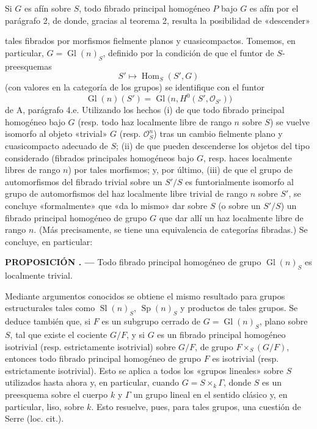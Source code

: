 \documentclass[11pt,twoside,openany]{book}
\numberwithin{equation}{section}
\newcommand{\src}[1]{%
  \phantomsection\hypertarget{src:#1}{}%
  \marginpar{\raggedleft\footnotesize\sffamily #1}%
}
\theoremstyle{plain}
\theoremstyle{definition}
\theoremstyle{remark}
\newcommand{\result}[2]{%
  \par\medskip\noindent\textbf{#1%
  \if\relax\detokenize{#2}\relax\else\space#2\fi. ---}\enspace
}
\newcommand{\FgaUnitKey}{frontmatter}
\renewcommand{\src}[1]{%
  \phantomsection\hypertarget{src:\FgaUnitKey:#1}{}%
  \marginpar{\raggedleft\footnotesize\sffamily #1}%
}
\theoremstyle{plain}
\theoremstyle{definition}
\theoremstyle{remark}
\begin{document}
Si $G$ es afín sobre $S$, todo fibrado principal homogéneo $P$ bajo $G$ es afín
por el parágrafo 2, de donde, gracias al teorema 2, resulta la posibilidad de
«descender»

\src{326}
tales fibrados por morfismos fielmente planos y cuasicompactos. Tomemos, en
particular, $G=\operatorname{Gl}(n)_S$, definido por la condición de que el
funtor de $S$-preesquemas
\[
  S'\longmapsto\operatorname{Hom}_S(S',G)
\]
(con valores en la categoría de los grupos) se identifique con el funtor
\[
  \operatorname{Gl}(n)(S')
  =\operatorname{Gl}\bigl(n,H^0(S',\mathcal O_{S'})\bigr)
\]
de A, parágrafo 4.e. Utilizando los hechos (i) de que todo fibrado principal
homogéneo bajo $G$ (resp. todo haz localmente libre de rango $n$ sobre $S$) se
vuelve isomorfo al objeto «trivial» $G$ (resp. $\mathcal O_S^n$) tras un cambio
fielmente plano y cuasicompacto adecuado de $S$; (ii) de que pueden descenderse
los objetos del tipo considerado (fibrados principales homogéneos bajo $G$,
resp. haces localmente libres de rango $n$) por tales morfismos; y, por último,
(iii) de que el grupo de automorfismos del fibrado trivial sobre un $S'/S$ es
funtorialmente isomorfo al grupo de automorfismos del haz localmente libre
trivial de rango $n$ sobre $S'$, se concluye «formalmente» que «da lo mismo»
dar sobre $S$ (o sobre un $S'/S$) un fibrado principal homogéneo de grupo $G$
que dar allí un haz localmente libre de rango $n$. (Más precisamente, se tiene
una equivalencia de categorías fibradas.) Se concluye, en particular:

\result{PROPOSICIÓN}{6.1} Todo fibrado principal homogéneo de grupo
$\operatorname{Gl}(n)_S$ es localmente trivial.

Mediante argumentos conocidos se obtiene el mismo resultado para grupos
estructurales tales como $\operatorname{Sl}(n)_S$, $\operatorname{Sp}(n)_S$ y
productos de tales grupos. Se deduce también que, si $F$ es un subgrupo cerrado
de $G=\operatorname{Gl}(n)_S$, plano sobre $S$, tal que existe el cociente
$G/F$, y si $G$ es un fibrado principal homogéneo isotrivial (resp.
estrictamente isotrivial) sobre $G/F$, de grupo $F\times_S(G/F)$, entonces todo
fibrado principal homogéneo de grupo $F$ es isotrivial (resp. estrictamente
isotrivial). Esto se aplica a todos los «grupos lineales» sobre $S$ utilizados
hasta ahora y, en particular, cuando $G=S\times_k\Gamma$, donde $S$ es un
preesquema sobre el cuerpo $k$ y $\Gamma$ un grupo lineal en el sentido clásico
y, en particular, liso, sobre $k$. Esto resuelve, pues, para tales grupos, una
cuestión de Serre (loc. cit.).
\end{document}
